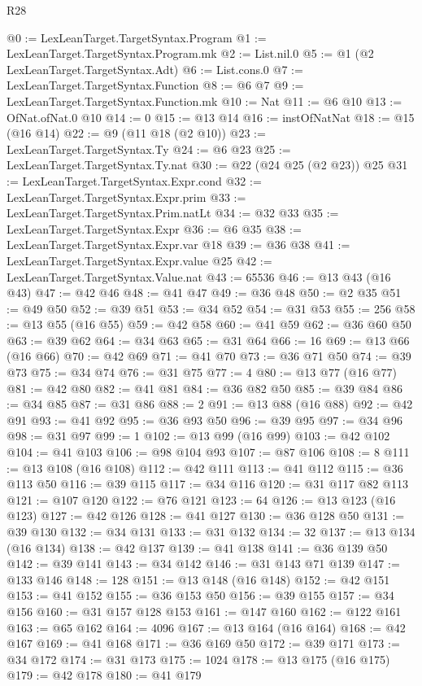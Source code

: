 \begin{lexlean}{R28}
\begin{coremodule}
@0 := LexLeanTarget.TargetSyntax.Program
@1 := LexLeanTarget.TargetSyntax.Program.mk
@2 := List.nil.{0}
@5 := @1 (@2 LexLeanTarget.TargetSyntax.Adt)
@6 := List.cons.{0}
@7 := LexLeanTarget.TargetSyntax.Function
@8 := @6 @7
@9 := LexLeanTarget.TargetSyntax.Function.mk
@10 := Nat
@11 := @6 @10
@13 := OfNat.ofNat.{0} @10
@14 := 0
@15 := @13 @14
@16 := instOfNatNat
@18 := @15 (@16 @14)
@22 := @9 (@11 @18 (@2 @10))
@23 := LexLeanTarget.TargetSyntax.Ty
@24 := @6 @23
@25 := LexLeanTarget.TargetSyntax.Ty.nat
@30 := @22 (@24 @25 (@2 @23)) @25
@31 := LexLeanTarget.TargetSyntax.Expr.cond
@32 := LexLeanTarget.TargetSyntax.Expr.prim
@33 := LexLeanTarget.TargetSyntax.Prim.natLt
@34 := @32 @33
@35 := LexLeanTarget.TargetSyntax.Expr
@36 := @6 @35
@38 := LexLeanTarget.TargetSyntax.Expr.var @18
@39 := @36 @38
@41 := LexLeanTarget.TargetSyntax.Expr.value @25
@42 := LexLeanTarget.TargetSyntax.Value.nat
@43 := 65536
@46 := @13 @43 (@16 @43)
@47 := @42 @46
@48 := @41 @47
@49 := @36 @48
@50 := @2 @35
@51 := @49 @50
@52 := @39 @51
@53 := @34 @52
@54 := @31 @53
@55 := 256
@58 := @13 @55 (@16 @55)
@59 := @42 @58
@60 := @41 @59
@62 := @36 @60 @50
@63 := @39 @62
@64 := @34 @63
@65 := @31 @64
@66 := 16
@69 := @13 @66 (@16 @66)
@70 := @42 @69
@71 := @41 @70
@73 := @36 @71 @50
@74 := @39 @73
@75 := @34 @74
@76 := @31 @75
@77 := 4
@80 := @13 @77 (@16 @77)
@81 := @42 @80
@82 := @41 @81
@84 := @36 @82 @50
@85 := @39 @84
@86 := @34 @85
@87 := @31 @86
@88 := 2
@91 := @13 @88 (@16 @88)
@92 := @42 @91
@93 := @41 @92
@95 := @36 @93 @50
@96 := @39 @95
@97 := @34 @96
@98 := @31 @97
@99 := 1
@102 := @13 @99 (@16 @99)
@103 := @42 @102
@104 := @41 @103
@106 := @98 @104 @93
@107 := @87 @106
@108 := 8
@111 := @13 @108 (@16 @108)
@112 := @42 @111
@113 := @41 @112
@115 := @36 @113 @50
@116 := @39 @115
@117 := @34 @116
@120 := @31 @117 @82 @113
@121 := @107 @120
@122 := @76 @121
@123 := 64
@126 := @13 @123 (@16 @123)
@127 := @42 @126
@128 := @41 @127
@130 := @36 @128 @50
@131 := @39 @130
@132 := @34 @131
@133 := @31 @132
@134 := 32
@137 := @13 @134 (@16 @134)
@138 := @42 @137
@139 := @41 @138
@141 := @36 @139 @50
@142 := @39 @141
@143 := @34 @142
@146 := @31 @143 @71 @139
@147 := @133 @146
@148 := 128
@151 := @13 @148 (@16 @148)
@152 := @42 @151
@153 := @41 @152
@155 := @36 @153 @50
@156 := @39 @155
@157 := @34 @156
@160 := @31 @157 @128 @153
@161 := @147 @160
@162 := @122 @161
@163 := @65 @162
@164 := 4096
@167 := @13 @164 (@16 @164)
@168 := @42 @167
@169 := @41 @168
@171 := @36 @169 @50
@172 := @39 @171
@173 := @34 @172
@174 := @31 @173
@175 := 1024
@178 := @13 @175 (@16 @175)
@179 := @42 @178
@180 := @41 @179

\end{coremodule}
\end{lexlean}
